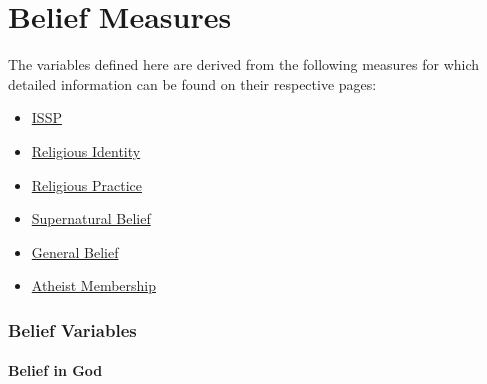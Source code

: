 \documentclass[
  letterpaper,
]{scrbook}
\providecommand{\tightlist}{%
  \setlength{\itemsep}{0pt}\setlength{\parskip}{0pt}}\usepackage{longtable,booktabs,array}
\begin{document}
\part{Belief Measures}

The variables defined here are derived from the following measures for
which detailed information can be found on their respective pages:

\begin{itemize}
\tightlist
\item
  \href{issp.qmd}{ISSP}
\item
  \href{religiousidentity.qmd}{Religious Identity}
\item
  \href{religiouspractice.qmd}{Religious Practice}
\item
  \href{supernaturalbelief.qmd}{Supernatural Belief}
\item
  \href{generalbelief.qmd}{General Belief}
\item
  \href{atheistmembership.qmd}{Atheist Membership}
\end{itemize}

\section*{Belief Variables}\label{belief-variables}


\subsection*{Belief in God}\label{belief-in-god}
\end{document}

